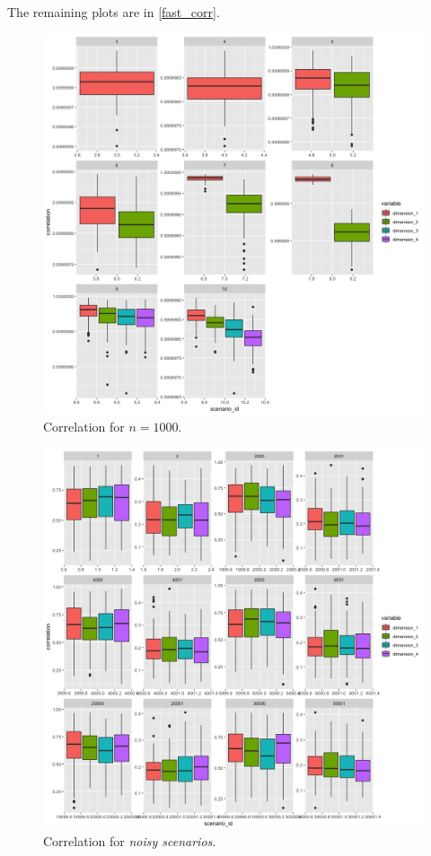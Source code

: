 \documentclass[11pt]{report}
\begin{document}
The remaining plots are in \autoref{fast_corr}.


\begin{figure}[ht]
\centering
    \includegraphics{./images/fast_correlation_1000.png}
    \caption{Correlation for $n = 1000$.}
    \label{fast_correlation_1000}
\end{figure}

\begin{figure}[ht]
\centering
    \includegraphics{./images/fast_correlation_noise.png}
    \caption{Correlation for \textit{noisy scenarios}.}
    \label{fast_correlation_noise}
\end{figure}
\end{document}

